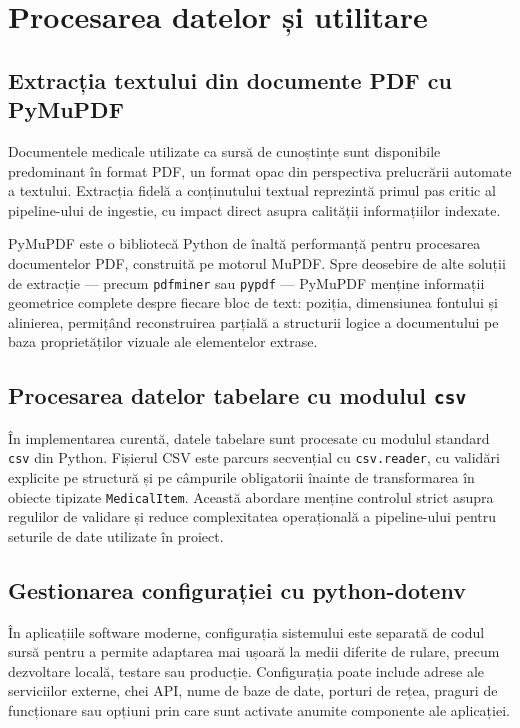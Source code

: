 \documentclass[12pt, a4paper, oneside, romanian]{teza-upb}
\begin{document}
\section{Procesarea datelor și utilitare}

\subsection{Extracția textului din documente PDF cu PyMuPDF}

Documentele medicale utilizate ca sursă de cunoștințe sunt disponibile predominant în format PDF, un format opac din perspectiva prelucrării automate a textului. Extracția fidelă a conținutului textual reprezintă primul pas critic al pipeline-ului de ingestie, cu impact direct asupra calității informațiilor indexate.

PyMuPDF este o bibliotecă Python de înaltă performanță pentru procesarea documentelor PDF, construită pe motorul MuPDF. Spre deosebire de alte soluții de extracție — precum \texttt{pdfminer} sau \texttt{pypdf} — PyMuPDF menține informații geometrice complete despre fiecare bloc de text: poziția, dimensiunea fontului și alinierea, permițând reconstruirea parțială a structurii logice a documentului pe baza proprietăților vizuale ale elementelor extrase.\cite{pymupdf_doc}

\subsection{Procesarea datelor tabelare cu modulul \texttt{csv}}

În implementarea curentă, datele tabelare sunt procesate cu modulul standard
\texttt{csv} din Python. Fișierul CSV este parcurs secvențial cu \texttt{csv.reader}, cu
validări explicite pe structură și pe câmpurile obligatorii înainte de
transformarea în obiecte tipizate \texttt{MedicalItem}. Această abordare menține
controlul strict asupra regulilor de validare și reduce complexitatea
operațională a pipeline-ului pentru seturile de date utilizate în proiect.


\subsection{Gestionarea configurației cu python-dotenv}

În aplicațiile software moderne, configurația sistemului este separată de codul sursă pentru a permite adaptarea mai ușoară la medii diferite de rulare, precum dezvoltare locală, testare sau producție. Configurația poate include adrese ale serviciilor externe, chei API, nume de baze de date, porturi de rețea, praguri de funcționare sau opțiuni prin care sunt activate anumite componente ale aplicației.
\end{document}
